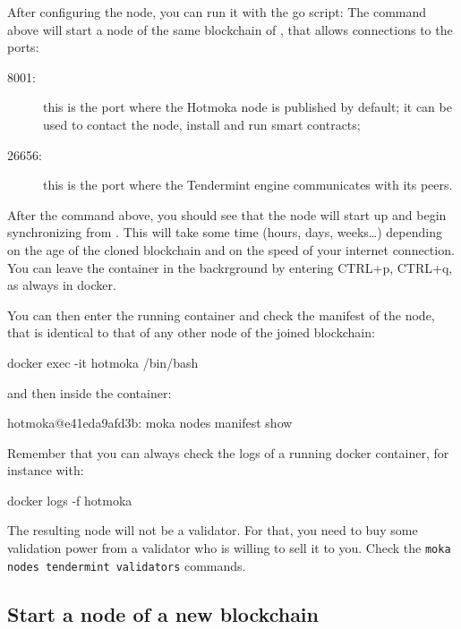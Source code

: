 After configuring the node, you can run it with the go script:
%
%
The command above will start a node of the same blockchain of \serverTendermint{},
that allows connections to the ports:
%
\begin{description}
\item[8001:] this is the port where the Hotmoka node is published by default;
	it can be used to contact the node, install and run smart contracts;
\item[26656:] this is the port where the Tendermint engine communicates with its peers.
\end{description}
%
After the command above, you should see that the node will start up and begin synchronizing
from \serverTendermint{}. This will take some time (hours, days, weeks\ldots) depending
on the age of the cloned blockchain and on the speed of your internet connection.
You can leave the container in the backrground by entering CTRL+p, CTRL+q, as always in docker.

You can then enter the running container and check the manifest of the node,
that is identical to that of any other node of the joined blockchain:
%
\begin{shellcommandbox}\begin{ttlst}
docker exec -it hotmoka /bin/bash
\end{ttlst}\end{shellcommandbox}
%
and then inside the container:
%
\begin{shellcommandbox}\begin{ttlst}
hotmoka@e41eda9afd3b: moka nodes manifest show
\end{ttlst}\end{shellcommandbox}
%
Remember that you can always check the logs of a running docker container, for instance with:
%
\begin{shellcommandbox}\begin{ttlst}
docker logs -f hotmoka
\end{ttlst}\end{shellcommandbox}

The resulting node will not be a validator. For that, you need to buy some validation power
from a validator who is willing to sell it to you.
Check the \texttt{moka nodes tendermint validators} commands.

\subsection{Start a node of a new blockchain}\label{subsec:start_hotmoka_tendermint}

